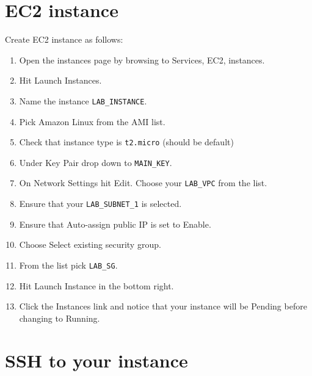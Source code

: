 \section{EC2 instance}

Create EC2 instance as follows:
\begin{enumerate}
\item Open the instances page by browsing to Services, EC2, instances.

\item Hit Launch Instances.

\item Name the instance \texttt{LAB\_INSTANCE}.

\item Pick Amazon Linux from the AMI list.

\item Check that instance type is \texttt{t2.micro} (should be default)

\item Under Key Pair drop down to \texttt{MAIN\_KEY}.

\item On Network Settings hit Edit. Choose your \texttt{LAB\_VPC} from the list.

\item Ensure that your \texttt{LAB\_SUBNET\_1} is selected.

\item Ensure that Auto-assign public IP is set to Enable.
  
\item Choose Select existing security group.

\item From the list pick \texttt{LAB\_SG}.

\item Hit Launch Instance in the bottom right.

\item Click the Instances link and notice that your instance will be Pending before changing to Running.
  
\end{enumerate}

\section{SSH to your instance}

